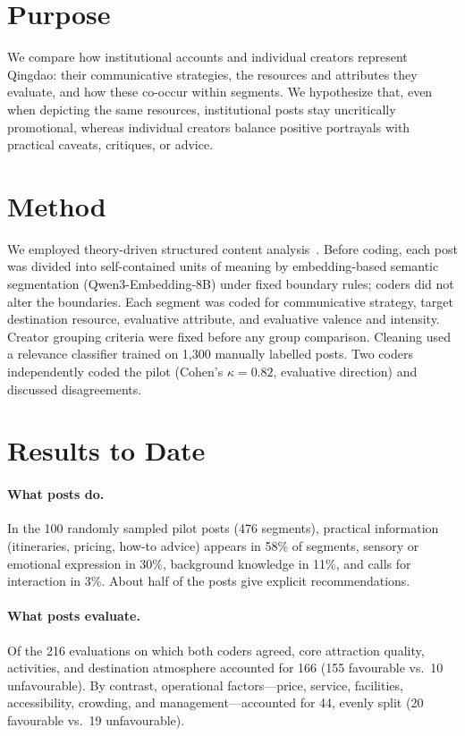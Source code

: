 \documentclass[runningheads]{llncs}
\begin{document}
\section{Purpose}
We compare how institutional accounts and individual creators represent Qingdao: their communicative strategies, the resources and attributes they evaluate, and how these co-occur within segments. We hypothesize that, even when depicting the same resources, institutional posts stay uncritically promotional, whereas individual creators balance positive portrayals with practical caveats, critiques, or advice.

\section{Method}
We employed theory-driven structured content analysis~\cite{krippendorff2019}. Before coding, each post was divided into self-contained units of meaning by embedding-based semantic segmentation (Qwen3-Embedding-8B) under fixed boundary rules; coders did not alter the boundaries. Each segment was coded for communicative strategy, target destination resource, evaluative attribute, and evaluative valence and intensity. Creator grouping criteria were fixed before any group comparison. Cleaning used a relevance classifier trained on 1{,}300 manually labelled posts. Two coders independently coded the pilot (Cohen's $\kappa = 0.82$, evaluative direction) and discussed disagreements.

\section{Results to Date}
\paragraph{What posts do.}
In the 100 randomly sampled pilot posts (476 segments), practical information (itineraries, pricing, how-to advice) appears in 58\% of segments, sensory or emotional expression in 30\%, background knowledge in 11\%, and calls for interaction in 3\%. About half of the posts give explicit recommendations.

\paragraph{What posts evaluate.}
Of the 216 evaluations on which both coders agreed, core attraction quality, activities, and destination atmosphere accounted for 166 (155 favourable vs.\ 10 unfavourable). By contrast, operational factors---price, service, facilities, accessibility, crowding, and management---accounted for 44, evenly split (20 favourable vs.\ 19 unfavourable).
\end{document}

